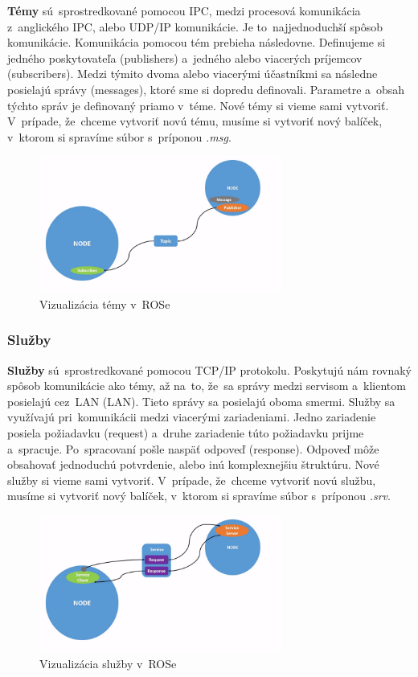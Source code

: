 	\textbf {Témy} sú~sprostredkované pomocou IPC, medzi procesová komunikácia z~anglického \acrlong{IPC},
	alebo UDP/IP komunikácie. Je to~najjednoduchší spôsob komunikácie. Komunikácia pomocou tém prebieha následovne.
	Definujeme si jedného poskytovateľa (publishers) a~jedného alebo viacerých príjemcov (subscribers). Medzi týmito
	dvoma alebo viacerými účastníkmi sa následne posielajú správy (messages), ktoré sme si dopredu definovali.
	Parametre a~obsah týchto správ je definovaný priamo v~téme. Nové témy si vieme sami vytvoriť. V~prípade,
	že~chceme vytvoriť novú tému, musíme si vytvoriť nový balíček, v~ktorom si spravíme súbor s~príponou \textit{.msg}.

	\begin{figure}[!htbp]
		\centering
		\includegraphics[width=8cm]{img/topicsExplanation.png}
		\caption{Vizualizácia témy v~ROSe~\cite{RosDoc}}
		\label{fig:topics}
	\end{figure}

\clearpage

\subsubsection{Služby}
\label{sec:services}

	\textbf {Služby} sú~sprostredkované pomocou TCP/IP protokolu. Poskytujú nám rovnaký spôsob komunikácie ako témy, až na~to, že~sa správy
	medzi servisom a~klientom posielajú cez~LAN (\acrlong{LAN}). Tieto správy sa posielajú oboma smermi. Služby sa využívajú pri~komunikácii
	medzi viacerými zariadeniami. Jedno zariadenie posiela požiadavku (request) a~druhe zariadenie túto požiadavku prijme
	a~spracuje. Po~spracovaní pošle naspäť odpoveď (response). Odpoveď môže obsahovať jednoduchú potvrdenie, alebo inú
	komplexnejšiu štruktúru. Nové služby si vieme sami vytvoriť. V~prípade, že~chceme vytvoriť novú službu, musíme
	si vytvoriť nový balíček, v~ktorom si spravíme súbor s~príponou \textit{.srv}.

	\begin{figure}[!htbp]
		\centering
		\includegraphics[width=8cm]{img/serviceExplanation.png}
		\caption{Vizualizácia služby v~ROSe~\cite{RosDoc}}
		\label{fig:service}
	\end{figure}

